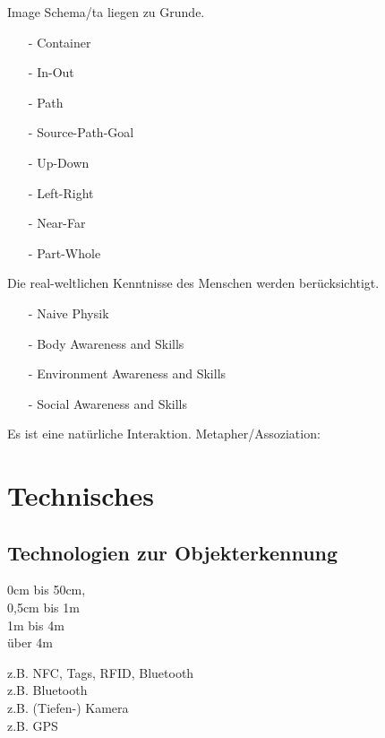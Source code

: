 \checkbox{\imageschemata} Image Schema/ta liegen zu Grunde.
\begin{itemize}
\item[-] \checkbox{\imageSchemaContainer} Container
\item[-] \checkbox{\imageSchemaInOut} In-Out
\item[-] \checkbox{\imageSchemaPath} Path
\item[-] \checkbox{\imageSchemaSourcePathGoal} Source-Path-Goal
\item[-] \checkbox{\imageSchemaUpDown} Up-Down
\item[-] \checkbox{\imageSchemaLeftRight} Left-Right
\item[-] \checkbox{\imageSchemaNearFar} Near-Far
\item[-] \checkbox{\imageSchemaPartWhole} Part-Whole
\end{itemize}

\checkbox{\realworld} Die real-weltlichen Kenntnisse des Menschen werden berücksichtigt.
\begin{itemize}
\item[-] \checkbox{\realworldNaivePhysic} Naive Physik
\item[-] \checkbox{\realworldBodyAwareness} Body Awareness and Skills
\item[-] \checkbox{\realworldEnvironmentAwareness} Environment Awareness and Skills
\item[-] \checkbox{\realworldSocialAwareness} Social Awareness and Skills
\end{itemize}

\checkbox{\metaphor} Es ist eine natürliche Interaktion. Metapher/Assoziation: \metaphordesc


\section*{Technisches}

\subsection*{Technologien zur Objekterkennung}


\begin{minipage}{0.3\textwidth}
\checkbox{\technologyObjectIntimate} 0cm bis 50cm, \\
\checkbox{\technologyObjectPersonal} 0,5cm bis 1m \\
\checkbox{\technologyObjectSocial} 1m bis 4m \\
\checkbox{\technologyObjectPublic} über 4m 
\end{minipage}
\begin{minipage}{0.5\textwidth}
z.B. NFC, Tags, RFID, Bluetooth \\
z.B. Bluetooth \\
z.B. (Tiefen-) Kamera \\
z.B. GPS
\end{minipage}

